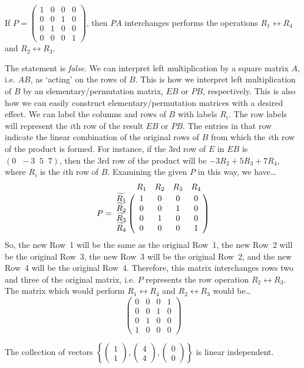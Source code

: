 \documentclass[11pt,letterpaper]{article}
\begin{document}
 If $P= \begin{pmatrix} 1 & 0 & 0 & 0 \\ 0 & 0 & 1 & 0 \\ 0 & 1 & 0 & 0 \\ 0 & 0 & 0 & 1 \end{pmatrix}$, then $PA$ interchanges performs the operations $R_1 \leftrightarrow R_4$ and $R_2 \leftrightarrow R_3$. \pspace

\sol The statement is \textit{false}. We can interpret left multiplication by a square matrix $A$, i.e. $AB$, as `acting' on the rows of $B$. This is how we interpret left multiplication of $B$ by an elementary/permutation matrix, $EB$ or $PB$, respectively. This is also how we can easily construct elementary/permutation matrices with a desired effect. We can label the columns and rows of $B$ with labels $R_i$. The row labels will represent the $i$th row of the result $EB$ or $PB$. The entries in that row indicate the linear combination of the original rows of $B$ from which the $i$th row of the product is formed. For instance, if the $3$rd row of $E$ in $EB$ is $(0\;\;-3\;\;5\;\;7)$, then the $3$rd row of the product will be $-3R_2 + 5R_3 + 7R_4$, where $R_i$ is the $i$th row of $B$. Examining the given $P$ in this way, we have\dots
	\[
	P= \bordermatrix{%
      	& R_1 & R_2 & R_3 & R_4 \cr
	\widetilde{R_1}   & 1   & 0   & 0   & 0 \cr
	\widetilde{R_2}   & 0   & 0   & 1   & 0 \cr
	\widetilde{R_3}   & 0   & 1   & 0   & 0 \cr
	\widetilde{R_4}   & 0   & 0   & 0   & 1 \cr
	}
	\]
So, the new Row~1 will be the same as the original Row~1, the new Row~2 will be the original Row~3, the new Row~3 will be the original Row~2, and the new Row~4 will be the original Row~4. Therefore, this matrix interchanges rows two and three of the original matrix, i.e. $P$ represents the row operation $R_2 \leftrightarrow R_3$. The matrix which would perform $R_1 \leftrightarrow R_4$ and $R_2 \leftrightarrow R_3$ would be\dots
	\[
	\begin{pmatrix}
	0 & 0 & 0 & 1 \\
	0 & 0 & 1 & 0 \\
	0 & 1 & 0 & 0 \\
	1 & 0 & 0 & 0 
	\end{pmatrix}
	\] \pvspace{1.3cm}



 The collection of vectors $\left\{ \begin{pmatrix} 1 \\ 1 \end{pmatrix}, \begin{pmatrix} 4 \\ 4 \end{pmatrix}, \begin{pmatrix} 0 \\ 0 \end{pmatrix} \right\}$ is linear independent. \pspace
\end{document}
